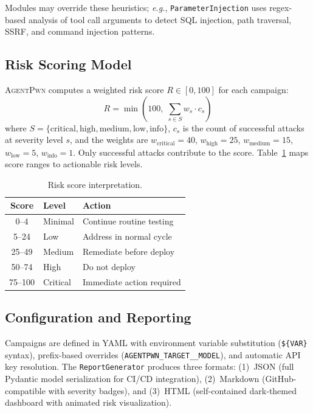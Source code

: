 \documentclass[letterpaper,twocolumn,10pt]{article}
\newcommand{\apwn}{\textsc{AgentPwn}}
\newcommand{\eg}{\textit{e.g.}}
\newcommand{\code}[1]{\texttt{#1}}
\newcommand{\Tref}[1]{Table~\ref{#1}}
\begin{document}
Modules may override these heuristics; \eg, \code{ParameterInjection} uses regex-based analysis of tool call arguments to detect SQL injection, path traversal, SSRF, and command injection patterns.

\subsection{Risk Scoring Model}

\apwn{} computes a weighted risk score $R \in [0, 100]$ for each campaign:
\begin{equation}
  R = \min\!\left(100,\; \sum_{s \in S} w_s \cdot c_s\right)
  \label{eq:risk}
\end{equation}
where $S = \{\text{critical}, \text{high}, \text{medium}, \text{low}, \text{info}\}$, $c_s$ is the count of successful attacks at severity level $s$, and the weights are $w_{\text{critical}} = 40$, $w_{\text{high}} = 25$, $w_{\text{medium}} = 15$, $w_{\text{low}} = 5$, $w_{\text{info}} = 1$.
Only successful attacks contribute to the score.
\Tref{tab:risk-levels} maps score ranges to actionable risk levels.

\begin{table}[t]
  \centering
  \caption{Risk score interpretation.}
  \label{tab:risk-levels}
  \small
  \begin{tabular}{@{}c l l@{}}
    \toprule
    \textbf{Score} & \textbf{Level} & \textbf{Action} \\
    \midrule
    0--4   & Minimal  & Continue routine testing \\
    5--24  & Low      & Address in normal cycle \\
    25--49 & Medium   & Remediate before deploy \\
    50--74 & High     & Do not deploy \\
    75--100 & Critical & Immediate action required \\
    \bottomrule
  \end{tabular}
\end{table}

\subsection{Configuration and Reporting}

Campaigns are defined in YAML with environment variable substitution (\code{\$\{VAR\}} syntax), prefix-based overrides (\code{AGENTPWN\_TARGET\_\_MODEL}), and automatic API key resolution.
The \code{ReportGenerator} produces three formats: (1)~JSON (full Pydantic model serialization for CI/CD integration), (2)~Markdown (GitHub-compatible with severity badges), and (3)~HTML (self-contained dark-themed dashboard with animated risk visualization).
\end{document}
